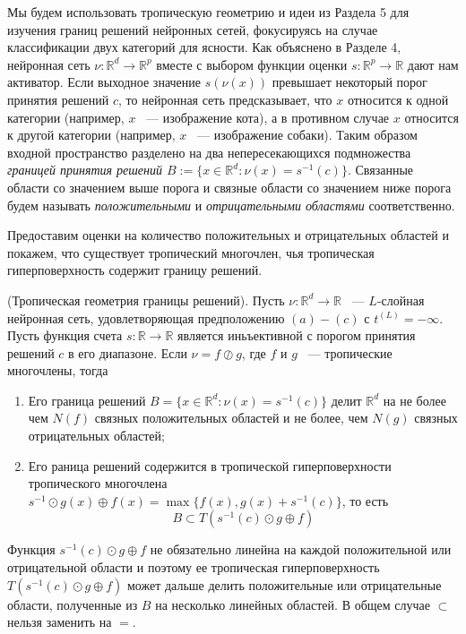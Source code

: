 \documentclass[russian]{lecture-notes}
\begin{document}
	Мы будем использовать тропическую геометрию и идеи из Раздела 5 для изучения границ решений нейронных сетей, фокусируясь на случае классификации двух категорий для ясности. Как объяснено в Разделе 4, нейронная сеть $\nu : \mathbb{R}^d \rightarrow \mathbb{R}^p$ вместе с выбором функции оценки $s: \mathbb{R}^p \rightarrow \mathbb{R}$ дают нам активатор. Если выходное значение $s(\nu(x))$ превышает некоторый порог принятия решений $c$, то нейронная сеть предсказывает, что $x$ относится к одной категории (например, $x$ ~--- изображение кота), а в противном случае $x$ относится к другой категории (например, $x$ ~--- изображение собаки). Таким образом входной пространство разделено на два непересекающихся подмножества \textit{границей принятия решений $B := \{x \in \mathbb{R}^d : \nu(x) = s^{-1}(c)\} $}. Связанные области со значением выше порога и связные области со значением ниже порога будем называть \textit{положительными} и \textit{отрицательными областями} соответственно.
	
	Предоставим оценки на количество положительных и отрицательных областей и покажем, что существует тропический многочлен, чья тропическая гиперповерхность содержит границу решений.
	\begin{Proposition}
		(Тропическая геометрия границы решений). Пусть $\nu : \mathbb{R}^d \rightarrow \mathbb{R}$  ~--- $L$-слойная нейронная сеть, удовлетворяющая предположению $(a)-(c)$ с $t^{(L)} = -\infty$. Пусть функция счета $s : \mathbb{R} \rightarrow \mathbb{R}$  является иньъективной с порогом принятия решений $c$ в его диапазоне. Если $\nu = f \oslash g$, где $f$ и $g$ ~--- тропические многочлены, тогда 
		\begin{enumerate}
			\item Его граница решений $B = \{x \in \mathbb{R}^d:\nu(x) = s^{-1}(c)\}$ делит $\mathbb{R}^d$ на не более чем $N(f)$ связных положительных областей и не более, чем $N(g)$ связных отрицательных областей;
			\item Его раница решений содержится в тропической гиперповерхности тропического многочлена $s^{-1}\odot g(x)\oplus f(x) = \max\{f(x),g(x)+s^{-1}(c)\}$, то есть 
				\[B 
				\subset T(s^{-1}(c)\odot g \oplus f)
				\]  
		\end{enumerate}
	
		Функция $s^{-1}(c) \odot g \oplus f$ не обязательно линейна на каждой положительной или отрицательной области и поэтому ее тропическая гиперповерхность $T(s^{-1}(c)\odot g \oplus f)$ может дальше делить положительные или отрицательные области, полученные из $B$ на несколько линейных областей. В общем случае $\subset$ нельзя заменить на $=$.
	\end{Proposition}
\end{document}
